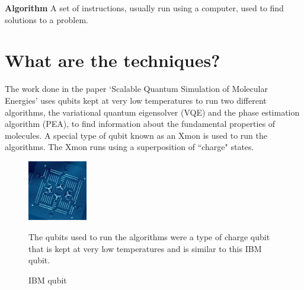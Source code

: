 \documentclass[14pt,landscape,color=UCLdarkred,margin=3cm]{uclposter}
\begin{document}
\begin{multicols}{3}
\begin{highlightbox}
\end{highlightbox}

\begin{highlightbox}
\textbf{Algorithm} A set of instructions, usually run using a computer, used to find solutions to a problem. 
\end{highlightbox}

\columnbreak

\section*{What are the techniques?}


The work done in the paper `Scalable Quantum Simulation of Molecular Energies' uses qubits kept at very low temperatures to run two different algorithms, the variational quantum eigensolver (VQE) and the phase estimation algorithm (PEA),  to find information about the fundamental properties of molecules. A special type of qubit known as an Xmon is used to run the algorithms. The Xmon runs using a superposition of ``charge" states.
\\
\begin{figure}[H]
  \begin{center}
\setlength{\fboxsep}{0.5em}
  \begin{minipage}[c]{9em}
  \begin{center}
  \includegraphics[width=7em]{4_Qubit.png}
    \caption{IBM qubit}
  \end{center}
    
  \end{minipage}
  \qquad
  \begin{minipage}[c]{20em}

The qubits used to run the algorithms were a type of charge qubit that is kept at very low temperatures and is similar to this IBM qubit.

  \end{minipage}
  \end{center}


\end{figure}
\end{multicols}
\end{document}
